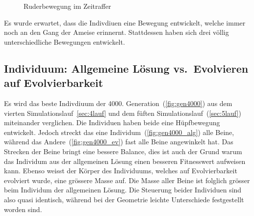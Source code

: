 \begin{figure}[H]
        \caption{Ruderbewegung im Zeitraffer\label{fig:ruder}}

      \end{figure}

      Es wurde erwartet, dass die Indivdiuen eine Bewegung entwickelt, welche immer noch an den Gang der Ameise erinnernt.
      Stattdessen haben sich drei völlig unterschiedliche Bewegungen entwickelt.

    \subsection{Individuum: Allgemeine Lösung vs.\ Evolvieren auf Evolvierbarkeit}

      Es wird das beste Indivdiuum der 4000. Generation~(\vref{fig:gen4000}) aus dem vierten Simulationslauf~\vref{sec:4lauf}
      und dem füften Simulationslauf~(\vref{sec:5lauf}) miteinander verglichen.
      Die Individuen haben beide eine Hüpfbewegung entwickelt.
      Jedoch streckt das eine Individum~(\vref{fig:gen4000_alg}) alle Beine,
      während das Andere~(\vref{fig:gen4000_ev}) fast alle Beine angewinkelt hat.
      Das Strecken der Beine bringt eine bessere Balance,
      dies ist auch der Grund warum das Individum aus der allgemeinen Lösung einen besseren Fitnesswert aufweisen kann.
      Ebenso weisst der Körper des Individuums, welches auf Evolvierbarkeit evolviert wurde, eine grössere Masse auf.
      Die Masse aller Beine ist folglich grösser beim Individum der allgemeinen Lösung.
      Die Steuerung beider Individuen sind also quasi identisch,
      während bei der Geometrie leichte Unterschiede festgestellt worden sind.

